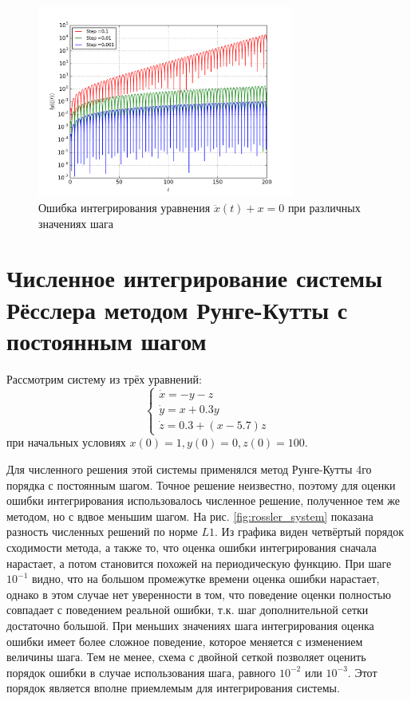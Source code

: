 \documentclass[a4paper]{article}
\begin{document}
\begin{figure}[H]
	\center
  \includegraphics[width=0.75\textwidth]{../pictures/lab3_cons_system.png}
  \caption{Ошибка интегрирования уравнения \(\ddot x(t) +x = 0\) при различных значениях шага}
  \label{fig:euler_system}
\end{figure}

\section{Численное интегрирование системы Рёсслера методом Рунге-Кутты с постоянным шагом}

Рассмотрим систему из трёх уравнений:
\begin{displaymath}
	\left\{
  \begin{array}{lr}
    \dot x = -y - z\\
		\dot y = x + 0.3y \\
    \dot z = 0.3 + (x-5.7)z
  \end{array}
\right.
\end{displaymath}
при начальных условиях \(x(0)=1,y(0)=0,z(0)=100\).

Для численного решения этой системы применялся метод Рунге-Кутты 4го порядка с
постоянным шагом. Точное решение неизвестно, поэтому для оценки ошибки интегрирования
использовалось численное решение, полученное тем же методом, но с вдвое меньшим шагом.
На рис. \ref{fig:rossler_system} показана разность численных решений по норме \(L1\).
Из графика виден четвёртый порядок сходимости метода, а также то, что оценка ошибки интегрирования
сначала нарастает, а потом становится похожей на периодическую функцию.
При шаге \(10^{-1}\) видно, что на большом промежутке времени оценка ошибки нарастает,
однако в этом случае нет уверенности в том, что поведение оценки полностью совпадает с
поведением реальной ошибки, т.к. шаг дополнительной сетки достаточно большой.
При меньших значениях шага интегрирования оценка ошибки имеет более сложное поведение,
которое меняется с изменением величины шага. Тем не менее, схема с двойной сеткой позволяет
оценить порядок ошибки в случае использования шага, равного \(10^{-2}\) или \(10^{-3}\).
Этот порядок является вполне приемлемым для интегрирования системы.
\end{document}
